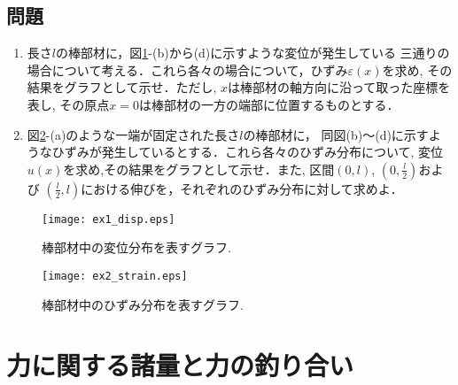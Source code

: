 \documentclass[10pt,a4j]{jbook}
\begin{document}
\subsection{問題}
\begin{enumerate}
\item
長さ$l$の棒部材に，図\ref{fig:fig1}-(b)から(d)に示すような変位が発生している
三通りの場合について考える．これら各々の場合について，ひずみ$\varepsilon(x)$を求め, 
その結果をグラフとして示せ．ただし, $x$は棒部材の軸方向に沿って取った座標を表し, 
その原点$x=0$は棒部材の一方の端部に位置するものとする．
\item
図\ref{fig:fig2}-(a)のような一端が固定された長さ$l$の棒部材に，
同図(b)〜(d)に示すようなひずみが発生しているとする．これら各々のひずみ分布について, 
変位$u(x)$を求め,その結果をグラフとして示せ．また, 区間$(0,l)$, $\left(0,\frac{l}{2}\right)$および
$\left(\frac{l}{2},l\right)$における伸びを，それぞれのひずみ分布に対して求めよ．
\end{enumerate}
\begin{figure}[h]
	\begin{center}
	\texttt{[image: ex1\_disp.eps]} 
	\end{center}
	\caption{棒部材中の変位分布を表すグラフ.} 
	\label{fig:fig1}
\end{figure}
\begin{figure}[h]
	\begin{center}
	\texttt{[image: ex2\_strain.eps]} 
	\end{center}
	\caption{棒部材中のひずみ分布を表すグラフ.} 
	\label{fig:fig2}
\end{figure}
\newpage
\section{力に関する諸量と力の釣り合い}
\end{document}
